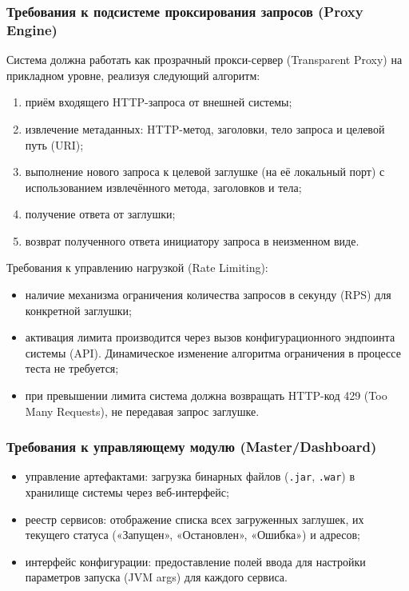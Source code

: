 \subsubsection {Требования к подсистеме проксирования запросов (Proxy Engine)}

Система должна работать как прозрачный прокси-сервер (Transparent Proxy) на прикладном уровне, реализуя следующий алгоритм:

\begin{enumerate}
\item приём входящего HTTP-запроса от внешней системы;
\item извлечение метаданных: HTTP-метод, заголовки, тело запроса и целевой путь (URI);
\item выполнение нового запроса к целевой заглушке (на её локальный порт) с использованием извлечённого метода, заголовков и тела;
\item получение ответа от заглушки;
\item возврат полученного ответа инициатору запроса в неизменном виде.
\end{enumerate}

Требования к управлению нагрузкой (Rate Limiting):

\begin{itemize}
\item наличие механизма ограничения количества запросов в секунду (RPS) для конкретной заглушки;
\item активация лимита производится через вызов конфигурационного эндпоинта системы (API). Динамическое изменение алгоритма ограничения в процессе теста не требуется;
\item при превышении лимита система должна возвращать HTTP-код 429 (Too Many Requests), не передавая запрос заглушке.
\end{itemize}

\subsubsection {Требования к управляющему модулю (Master/Dashboard)}

\begin{itemize}
\item управление артефактами: загрузка бинарных файлов (\texttt{.jar}, \texttt{.war}) в хранилище системы через веб-интерфейс;
\item реестр сервисов: отображение списка всех загруженных заглушек, их текущего статуса («Запущен», «Остановлен», «Ошибка») и адресов;
\item интерфейс конфигурации: предоставление полей ввода для настройки параметров запуска (JVM args) для каждого сервиса.
\end{itemize}

